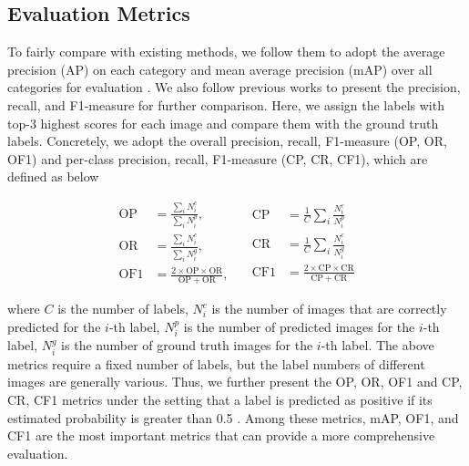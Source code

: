 \documentclass[10pt,twocolumn,letterpaper]{article}
\begin{document}
\subsection{Evaluation Metrics}
To fairly compare with existing methods, we follow them to adopt the average precision (AP) on each category and mean average precision (mAP) over all categories for evaluation \cite{wei2016hcp,yang2016exploit}. We also follow previous works \cite{zhu2017learning,li2017improving} to present the precision, recall, and F1-measure for further comparison. Here, we assign the labels with top-$3$ highest scores for each image and compare them with the ground truth labels. Concretely, we adopt the overall precision, recall, F1-measure (OP, OR, OF1) and per-class precision, recall, F1-measure (CP, CR, CF1), which are defined as below
\begin{small}
\begin{equation}
   \begin{split}
         \mathrm{OP}&=\frac{\sum_{i}N_{i}^{c}}{\sum_{i}N_{i}^{p}},\quad\\
         \mathrm{OR}&=\frac{\sum_{i}N_{i}^{c}}{\sum_{i}N_{i}^{g}},\quad\\
         \mathrm{OF}1&=\frac{2 \times \mathrm{OP} \times \mathrm{OR}}{\mathrm{OP}+\mathrm{OR}},\quad
   \end{split}
      \begin{split}
         \mathrm{CP}&=\frac{1}{C}\sum_{i}\frac{N_{i}^{c}}{N_{i}^{p}}\\
         \mathrm{CR}&=\frac{1}{C}\sum_{i}\frac{N_{i}^{c}}{N_{i}^{g}}\\
         \mathrm{CF}1&=\frac{2 \times \mathrm{CP} \times \mathrm{CR}}{\mathrm{CP}+\mathrm{CR}}
   \end{split}
   \label{eqn:metric}
\end{equation}
\end{small}where $C$ is the number of labels, $N_{i}^{c}$ is the number of images that are correctly predicted for the $i$-th label, $N_{i}^{p}$ is the number of predicted images for the $i$-th label, $N_{i}^{g}$ is the number of ground truth images for the $i$-th label. The above metrics require a fixed number of labels, but the label numbers of different images are generally various. Thus, we further present the OP, OR, OF1 and CP, CR, CF1 metrics under the setting that a label is predicted as positive if its estimated probability is greater than 0.5 \cite{zhu2017learning}. Among these metrics, mAP, OF1, and CF1 are the most important metrics that can provide a more comprehensive evaluation.
\end{document}

